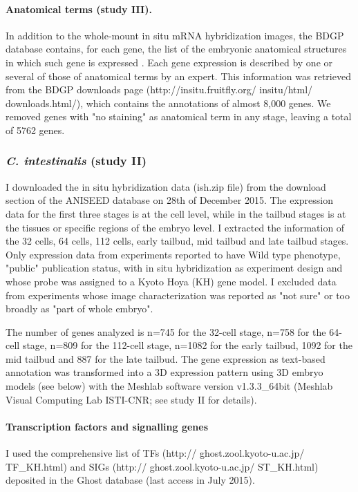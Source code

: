 \paragraph{Anatomical terms (study III).}
In addition to the whole-mount in situ mRNA hybridization images, the BDGP database contains, for each gene, the list of the embryonic anatomical structures in which such gene is expressed \citep{Tomancak2007}. Each gene expression is described by one or several of those of anatomical terms by an expert. 
This information was retrieved from the BDGP downloads page (http://insitu.fruitfly.org/ insitu/html/ downloads.html/), which contains the annotations of almost 8,000 genes. We removed genes with "no staining" as anatomical term in any stage, leaving a total of 5762 genes.

\subsubsection{\textit{C. intestinalis} (study II)}

I downloaded the in situ hybridization data (ish.zip file) from the download section of the ANISEED database on 28th of December 2015. 
The expression data for the first three stages is at the cell level, while in the tailbud stages is at the tissues or specific regions of the embryo level. 
I extracted the information of the 32 cells, 64 cells, 112 cells, early tailbud, mid tailbud and late tailbud stages. Only expression data from experiments reported to have Wild type phenotype, "public" publication status, with in situ hybridization as experiment design and whose probe was assigned to a Kyoto Hoya (KH) \citep{Satou2008} gene model.
I excluded data from experiments whose image characterization was reported as "not sure" or too broadly as "part of whole embryo".

The number of genes analyzed is n=745 for the 32-cell stage, n=758 for the 64-cell stage, n=809 for the 112-cell stage, n=1082 for the early tailbud, 1092 for the mid tailbud and 887 for the late tailbud. 
The gene expression as text-based annotation was transformed into a 3D expression pattern using 3D embryo models (see below) with the Meshlab software version v1.3.3\_64bit (Meshlab Visual Computing Lab ISTI-CNR; see study II for details).

\paragraph{Transcription factors and signalling genes}
I used the comprehensive list of TFs (http:// ghost.zool.kyoto-u.ac.jp/ TF\_KH.html) and SIGs (http:// ghost.zool.kyoto-u.ac.jp/ ST\_KH.html) deposited in the Ghost database (last access in July 2015).
 
